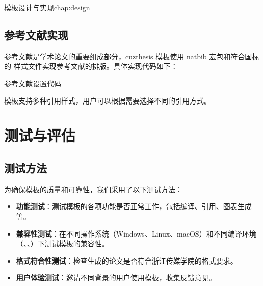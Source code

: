 \begin{cuzchapter}{模板设计与实现}{chap:design}
    \subsection{参考文献实现}

    参考文献是学术论文的重要组成部分，cuzthesis 模板使用 natbib 宏包和符合国标的  样式文件实现参考文献的排版。具体实现代码如下：

    \begin{listing}[htbp]
        \caption{参考文献设置代码}
        \label{code:bibliography}
        \begin{texcode}

            \setlength{\bibsep}{0.5ex}
            \renewcommand{\bibfont}{\small}
        \end{texcode}
    \end{listing}

    模板支持多种引用样式，用户可以根据需要选择不同的引用方式。

    \section{测试与评估}\label{sec:testing-evaluation}

    \subsection{测试方法}

    为确保模板的质量和可靠性，我们采用了以下测试方法：

    \begin{itemize}
        \item \textbf{功能测试}：测试模板的各项功能是否正常工作，包括编译、引用、图表生成等。

        \item \textbf{兼容性测试}：在不同操作系统（Windows、Linux、macOS）和不同编译环境（、、）下测试模板的兼容性。

        \item \textbf{格式符合性测试}：检查生成的论文是否符合浙江传媒学院的格式要求。

        \item \textbf{用户体验测试}：邀请不同背景的用户使用模板，收集反馈意见。
    \end{itemize}


\end{cuzchapter}
